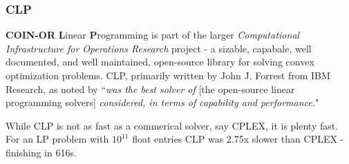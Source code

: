 \documentclass{beamer}
\begin{document}
\begin{frame}
\frametitle{CLP}

    \textbf{COIN-OR} \textbf{L}inear \textbf{P}rogramming is part of the larger
    \textit{Computational Infrastructure for Operations Research} project
    - a sizable, capabale, well documented, and well maintained, open-source
     library for solving convex optimization problems. CLP, primarily written
     by John J. Forrest from IBM Research, as noted by 
     \cite{gearhart_comparison_2013} ``\textit{was the best solver of} [the open-source linear programming solvers] \textit{considered, in terms of
     capability and performance.}"

     \par

     While CLP is not as fast as a commerical solver, say CPLEX, it is plenty
     fast. For an LP problem with $10^{11}$ float entries CLP was 2.75x slower
     than CPLEX - finishing in 616s. 

\end{frame}
\end{document}
